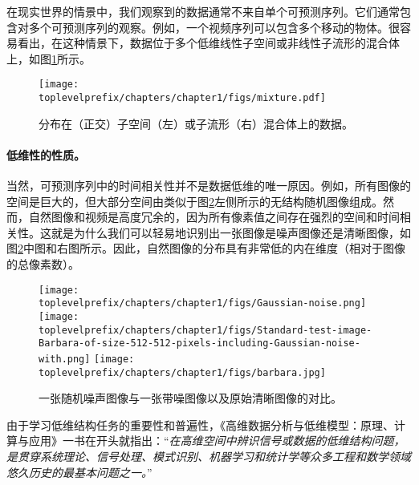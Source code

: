 \documentclass[../../book-main_zh.tex]{subfiles}
\begin{document}
在现实世界的情景中，我们观察到的数据通常不来自单个可预测序列。它们通常包含对多个可预测序列的观察。例如，一个视频序列可以包含多个移动的物体。很容易看出，在这种情景下，数据位于多个低维线性子空间或非线性子流形的混合体上，如图\ref{fig:mixture-models}所示。
\begin{figure}
    \centering
    \texttt{[image: \\toplevelprefix/chapters/chapter1/figs/mixture.pdf]}
    \caption{分布在（正交）子空间（左）或子流形（右）混合体上的数据。}
    \label{fig:mixture-models}
\end{figure}


\paragraph{低维性的性质。}
当然，可预测序列中的时间相关性并不是数据低维的唯一原因。例如，所有图像的空间是巨大的，但大部分空间由类似于图\ref{fig:noise-image}左侧所示的无结构随机图像组成。然而，自然图像和视频是高度冗余的，因为所有像素值之间存在强烈的空间和时间相关性。这就是为什么我们可以轻易地识别出一张图像是噪声图像还是清晰图像，如图\ref{fig:noise-image}中图和右图所示。因此，自然图像的分布具有非常低的内在维度（相对于图像的总像素数）。

\begin{figure}
    \centering
    \texttt{[image: \\toplevelprefix/chapters/chapter1/figs/Gaussian-noise.png]}\hspace{2mm} \texttt{[image: \\toplevelprefix/chapters/chapter1/figs/Standard-test-image-Barbara-of-size-512-512-pixels-including-Gaussian-noise-with.png]} \hspace{2mm} \texttt{[image: \\toplevelprefix/chapters/chapter1/figs/barbara.jpg]}
    \caption{一张随机噪声图像与一张带噪图像以及原始清晰图像的对比。%
    }
    \label{fig:noise-image}
\end{figure}

由于学习低维结构任务的重要性和普遍性，《高维数据分析与低维模型：原理、计算与应用》\cite{Wright-Ma-2022}一书在开头就指出：“{\em 在高维空间中辨识信号或数据的低维结构问题，是贯穿系统理论、信号处理、模式识别、机器学习和统计学等众多工程和数学领域悠久历史的最基本问题之一。}”
\end{document}
